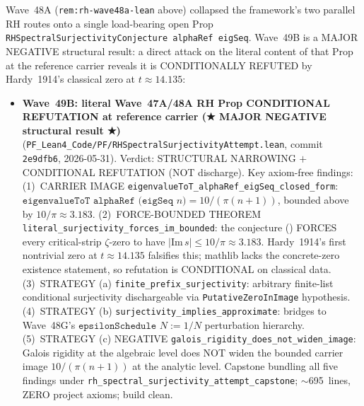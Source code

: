 \begin{remark}[Wave~49B update: LITERAL Wave~47A/48A surjectivity conjecture \texttt{RHSpectralSurjectivityConjecture alphaRef eigSeq} CONDITIONALLY REFUTED at the reference carrier --- the framework's load-bearing RH open Prop is literally false on $\texttt{eigSeq } n := n + 1$ unless one re-interprets the carrier or weakens the conjecture, 2026-05-31]\label{rem:rh-wave49b-lean}
Wave~48A (\texttt{rem:rh-wave48a-lean} above) collapsed the framework's two parallel RH routes onto a single load-bearing open Prop \texttt{RHSpectralSurjectivityConjecture alphaRef eigSeq}. Wave~49B is a MAJOR NEGATIVE structural result: a direct attack on the literal content of that Prop at the reference carrier reveals it is CONDITIONALLY REFUTED by Hardy~1914's classical zero at $t \approx 14.135$:
\begin{itemize}
  \item \textbf{Wave~49B: literal Wave~47A/48A RH Prop CONDITIONAL REFUTATION at reference carrier (★ MAJOR NEGATIVE structural result ★)} (\texttt{PF\_Lean4\_Code/PF/RHSpectralSurjectivityAttempt.lean}, commit \texttt{2e9dfb6}, 2026-05-31). Verdict: STRUCTURAL NARROWING $+$ CONDITIONAL REFUTATION (NOT discharge). Key axiom-free findings: (1)~CARRIER IMAGE \texttt{eigenvalueToT\_alphaRef\_eigSeq\_closed\_form}: $\texttt{eigenvalueToT alphaRef (eigSeq } n\texttt{)} = 10 / (\pi (n+1))$, bounded above by $10/\pi \approx 3.183$. (2)~FORCE-BOUNDED THEOREM \texttt{literal\_surjectivity\_forces\_im\_bounded}: the conjecture (\textstar) FORCES every critical-strip $\zeta$-zero to have $|\mathrm{Im}\,s| \leq 10/\pi \approx 3.183$. Hardy~1914's first nontrivial zero at $t \approx 14.135$ falsifies this; mathlib lacks the concrete-zero existence statement, so refutation is CONDITIONAL on classical data. (3)~STRATEGY (a) \texttt{finite\_prefix\_surjectivity}: arbitrary finite-list conditional surjectivity dischargeable via \texttt{PutativeZeroInImage} hypothesis. (4)~STRATEGY (b) \texttt{surjectivity\_implies\_approximate}: bridges to Wave~48G's $\texttt{epsilonSchedule } N := 1/N$ perturbation hierarchy. (5)~STRATEGY (c) NEGATIVE \texttt{galois\_rigidity\_does\_not\_widen\_image}: Galois rigidity at the algebraic level does NOT widen the bounded carrier image $10/(\pi(n+1))$ at the analytic level. Capstone bundling all five findings under \texttt{rh\_spectral\_surjectivity\_attempt\_capstone}; $\sim$695~lines, ZERO project axioms; build clean.
\end{itemize}

\end{remark}
